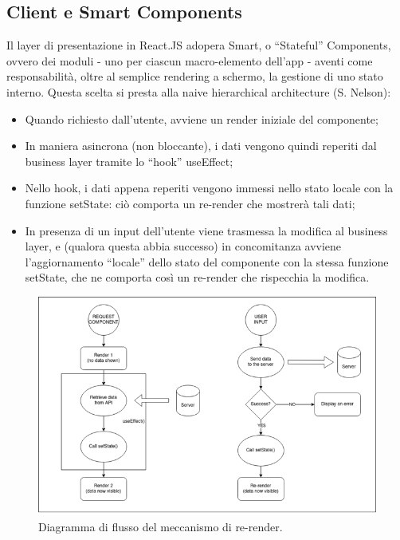 \documentclass[a4paper, 11pt]{article}
\begin{document}
\subsection{Client e Smart Components}
Il layer di presentazione in React.JS adopera Smart, o “Stateful” Components, ovvero dei moduli - uno per ciascun macro-elemento dell'app - aventi come responsabilità, oltre al semplice rendering a schermo, la gestione di uno stato interno. Questa scelta si presta alla naive hierarchical architecture (S. Nelson):
\begin{itemize}
    \item Quando richiesto dall'utente, avviene un render iniziale del componente;
    \item In maniera asincrona (non bloccante), i dati vengono quindi reperiti dal business layer tramite lo “hook” useEffect;
    \item Nello hook, i dati appena reperiti vengono immessi nello stato locale con la funzione setState: ciò comporta un re-render che mostrerà tali dati;
    \item In presenza di un input dell'utente viene trasmessa la modifica al business layer, e (qualora questa abbia successo) in concomitanza avviene l'aggiornamento “locale” dello stato del componente con la stessa funzione setState, che ne comporta così un re-render che rispecchia la modifica.
\end{itemize}
\begin{figure}[H]
    \centering
    \includegraphics[width=\textwidth]{SmartComponent}
    \caption{Diagramma di flusso del meccanismo di re-render.}
\end{figure}
\end{document}
